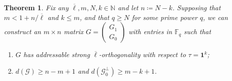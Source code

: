 \documentclass[11pt]{article}
\newtheorem{theorem}{Theorem}[section]
\theoremstyle{definition}
\renewcommand{\le}{\leqslant}
\renewcommand{\ge}{\geqslant}
\renewcommand{\geq}{\geqslant}
\newcommand{\cG}{\mathcal{G}}
\newcommand{\FF}{\mathbb{F}}
\newcommand*{\ol}{\overline}
\begin{document}
\begin{theorem}\label{thm:GRS_gen_mat_address}
Fix any $\ol{\ell}, m, N, k\in \mathbb{N}$ and let $n \coloneq N-k$. Supposing that $m < 1+n/\ol\ell$ and $k \le m$, and that $q \geq N$ for some prime power $q$, we can construct an $m\times n$ matrix $G = \begin{pmatrix}
        G_1\\ G_0
    \end{pmatrix}$
with entries in $\FF_q$ such that
\begin{enumerate}[itemsep = 0pt]
    \item $G$ has addressable strong $\ol{\ell}$-orthogonality with respect to $\tau = \mathbf{1}^k$;
    \item $d(\cG)\ge n-m+1$ and $d(\cG_0^\perp) \ge m-k+1$.
\end{enumerate}
\end{theorem}
\end{document}
